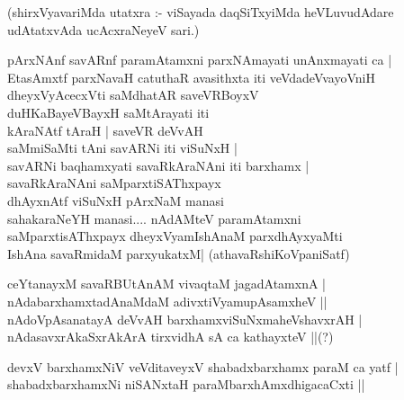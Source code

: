 (shirxVyavariMda utatxra :- viSayada daqSiTxyiMda heVLuvudAdare udAtatxvAda ucAcxraNeyeV sari.)
\begin{itemize}
{\bf 
\item[33.] pArxNAnf savARnf paramAtamxni parxNAmayati unAnxmayati ca |\\\label{149}
EtasAmxtf parxNavaH catuthaR avasithxta iti veVdadeVvayoVniH \\
dheyxVyAcecxVti saMdhatAR saveVRBoyxV \\
duHKaBayeVBayxH saMtArayati iti \\
kAraNAtf tAraH | saveVR deVvAH \\
saMmiSaMti tAni savARNi iti viSuNxH |\\
savARNi baqhamxyati savaRkAraNAni iti barxhamx |\\
savaRkAraNAni saMparxtiSAThxpayx \\
dhAyxnAtf viSuNxH pArxNaM manasi \\
sahakaraNeYH manasi.... nAdAMteV paramAtamxni\\
saMparxtisAThxpayx dheyxVyamIshAnaM parxdhAyxyaMti\\
IshAna savaRmidaM parxyukatxM|\label{102}
\hfill{(athavaRshiKoVpaniSatf)}
\item[34.] ceYtanayxM savaRBUtAnAM vivaqtaM jagadAtamxnA |\\\label{149}
nAdabarxhamxtadAnaMdaM adivxtiVyamupAsamxheV ||\\
nAdoVpAsanatayA deVvAH barxhamxviSuNxmaheVshavxrAH |\\
nAdasavxrAkaSxrAkArA tirxvidhA sA ca kathayxteV ||\quad(?)\label{149}
\item[35.] devxV barxhamxNiV veVditaveyxV shabadxbarxhamx paraM ca yatf |\\\label{149}
shabadxbarxhamxNi niSANxtaH paraMbarxhAmxdhigacaCxti ||\label{160}

}
\end{itemize}
